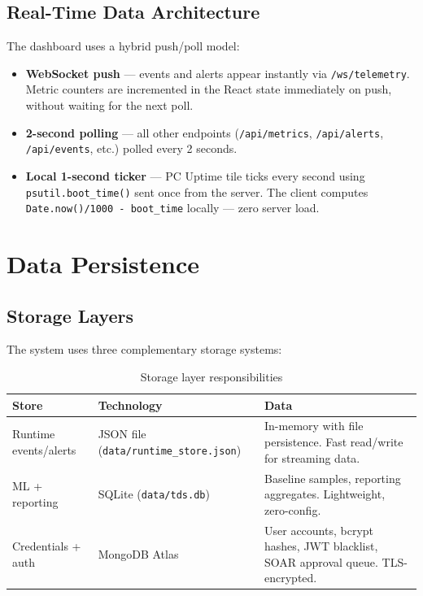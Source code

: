 \documentclass[12pt,a4paper]{article}
\begin{document}
\subsection{Real-Time Data Architecture}

The dashboard uses a hybrid push/poll model:

\begin{itemize}[noitemsep]
    \item \textbf{WebSocket push} — events and alerts appear instantly via \texttt{/ws/telemetry}.
          Metric counters are incremented in the React state immediately on push,
          without waiting for the next poll.
    \item \textbf{2-second polling} — all other endpoints (\texttt{/api/metrics},
          \texttt{/api/alerts}, \texttt{/api/events}, etc.) polled every 2 seconds.
    \item \textbf{Local 1-second ticker} — PC Uptime tile ticks every second using
          \texttt{psutil.boot\_time()} sent once from the server. The client computes
          \texttt{Date.now()/1000 - boot\_time} locally — zero server load.
\end{itemize}

\section{Data Persistence}

\subsection{Storage Layers}

The system uses three complementary storage systems:

\begin{table}[H]
\centering
\begin{tabularx}{\linewidth}{llX}
\toprule
\textbf{Store} & \textbf{Technology} & \textbf{Data} \\
\midrule
Runtime events/alerts & JSON file (\texttt{data/runtime\_store.json}) & In-memory with file persistence. Fast read/write for streaming data. \\
ML + reporting & SQLite (\texttt{data/tds.db}) & Baseline samples, reporting aggregates. Lightweight, zero-config. \\
Credentials + auth & MongoDB Atlas & User accounts, bcrypt hashes, JWT blacklist, SOAR approval queue. TLS-encrypted. \\
\bottomrule
\end{tabularx}
\caption{Storage layer responsibilities}
\end{table}
\end{document}
